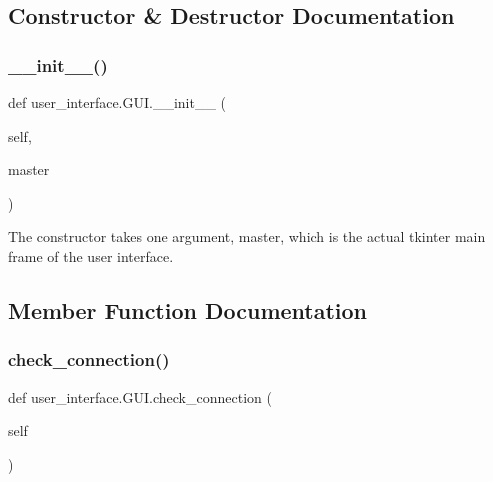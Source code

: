 \subsection{Constructor \& Destructor Documentation}
\mbox{\label{classuser__interface_1_1GUI_a56cf4f384dbb041483a69bbe54f3e08a}} 
\subsubsection{\texorpdfstring{\+\_\+\+\_\+init\+\_\+\+\_\+()}{\_\_init\_\_()}}
{\footnotesize\ttfamily def user\+\_\+interface.\+G\+U\+I.\+\_\+\+\_\+init\+\_\+\+\_\+ (\begin{DoxyParamCaption}\item[{}]{self,  }\item[{}]{master }\end{DoxyParamCaption})}



The constructor takes one argument, master, which is the actual tkinter main frame of the user interface. 



\subsection{Member Function Documentation}
\mbox{\label{classuser__interface_1_1GUI_a5787b976dce9ca32ce3dacf0b96b8ee7}} 
\subsubsection{\texorpdfstring{check\+\_\+connection()}{check\_connection()}}
{\footnotesize\ttfamily def user\+\_\+interface.\+G\+U\+I.\+check\+\_\+connection (\begin{DoxyParamCaption}\item[{}]{self }\end{DoxyParamCaption})}



